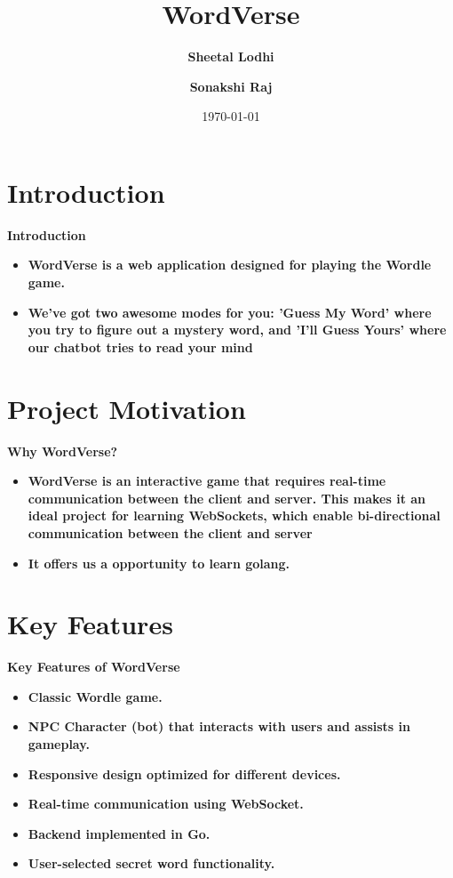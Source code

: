 \documentclass{beamer}
\title{WordVerse}
\subtitle{}
\author{\bfseries Sheetal Lodhi \and \bfseries Sonakshi Raj }
\date{\today}
\begin{document}
 
\begin{frame}
    \titlepage
\end{frame}

\section{Introduction}

\begin{frame}{\bfseries Introduction}
    \begin{itemize}
        \item \bfseries WordVerse is a web application designed for playing the Wordle game.
        \item \bfseries We've got two awesome modes for you: 'Guess My Word' where you try to figure out a mystery word, and 'I'll Guess Yours' where our chatbot tries to read your mind
    \end{itemize}
\end{frame}

\section{Project Motivation}

\begin{frame}{\bfseries Why WordVerse?}
    \begin{itemize}
        \item \bfseries WordVerse is an interactive game that requires real-time communication between the client and server. This makes it an ideal project for learning WebSockets, which enable bi-directional communication between the client and server
        \item \bfseries It offers us a opportunity to learn golang. 
    \end{itemize}
\end{frame}

\section{Key Features}

\begin{frame}{\bfseries Key Features of WordVerse}
    \begin{itemize}
        \item \bfseries Classic Wordle game.
        \item \bfseries NPC Character (bot) that interacts with users and assists in gameplay.
        \item \bfseries Responsive design optimized for different devices.
        \item \bfseries Real-time communication using WebSocket.
        \item \bfseries Backend implemented in Go.
        \item \bfseries User-selected secret word functionality.
    \end{itemize}
\end{frame}
\end{document}
